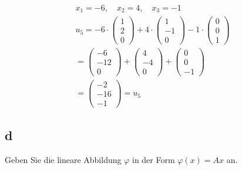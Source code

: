 \begin{align*}
    x_1 = -6, \quad x_2 = 4, \quad x_3 = -1 \\
    u_5 = -6 \cdot \begin{pmatrix}
        1 \\ 2 \\ 0
    \end{pmatrix} + 4 \cdot \begin{pmatrix}
        1 \\ -1 \\ 0
    \end{pmatrix} - 1 \cdot \begin{pmatrix}
        0 \\ 0 \\ 1
    \end{pmatrix} \\
    = \begin{pmatrix}
        -6 \\ -12 \\ 0
    \end{pmatrix} + \begin{pmatrix}
        4 \\-4 \\ 0
    \end{pmatrix} + \begin{pmatrix}
        0 \\ 0 \\ -1
    \end{pmatrix} \\
    = \begin{pmatrix}
        -2 \\ -16 \\ -1
    \end{pmatrix} = u_5
\end{align*}

\subsection{d}
Geben Sie die lineare Abbildung $\varphi$ in der Form $\varphi(x) = Ax$ an.

